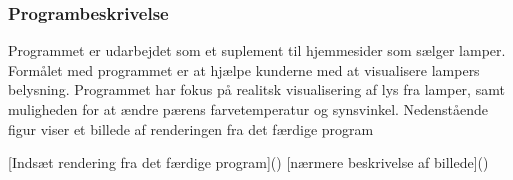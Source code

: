 \subsubsection{Programbeskrivelse}

Programmet er udarbejdet som et suplement til hjemmesider som sælger lamper. Formålet med programmet er at hjælpe kunderne med at visualisere lampers belysning. Programmet har fokus på realitsk visualisering af lys fra lamper, samt muligheden for at ændre pærens farvetemperatur og synsvinkel.
Nedenstående figur viser et billede af renderingen fra det færdige program

[Indsæt rendering fra det færdige program]()
[nærmere beskrivelse af billede]()
